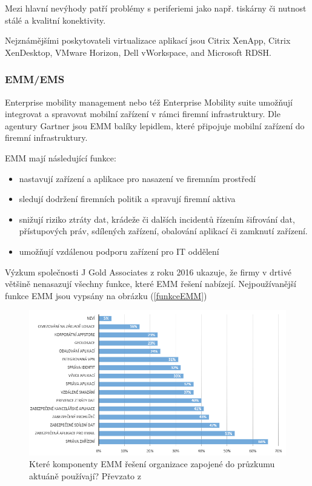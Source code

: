 Mezi hlavní nevýhody patří problémy s periferiemi jako např. tiskárny či nutnost stálé a kvalitní konektivity.
 
  Nejznámějšími poskytovateli virtualizace aplikací jsou Citrix XenApp, Citrix XenDesktop, VMware Horizon, Dell vWorkspace, and Microsoft RDSH.%
 
 
 \subsubsection{EMM/EMS}\label{EMM}
 Enterprise mobility management nebo též Enterprise Mobility suite umožňují integrovat a spravovat mobilní zařízení v rámci firemní infrastruktury.
 Dle agentury Gartner jsou EMM balíky lepidlem, které připojuje mobilní zařízení do firemní infrastruktury. \cite{Gartner_EMM_2016}
 
 EMM mají následující funkce:
 \begin{itemize}
     \item nastavují zařízení a aplikace pro nasazení ve firemním prostředí
     \item sledují dodržení firemních politik a spravují firemní aktiva
     \item snižují riziko ztráty dat, krádeže či dalších incidentů řízením šifrování dat, přístupových práv, sdílených zařízení, obalování aplikací či zamknutí zařízení.
     \item umožňují vzdálenou podporu zařízení pro IT oddělení
 \end{itemize}
 
Výzkum společnosti J Gold Associates z roku 2016 \cite{JBBrief}%
ukazuje, že firmy v drtivé většině nenasazují všechny funkce, které EMM řešení nabízejí. Nejpoužívanější funkce EMM jsou vypsány na obrázku (\ref{funkceEMM}) 

\begin{figure}[h!]
\centering
\includegraphics[width=13cm]{img/funkceEMM}
\caption{Které komponenty EMM řešení organizace zapojené do průzkumu aktuáně používají? Převzato z \cite{JBBrief}} 
\end{figure}\label{funkceEMM}
 
